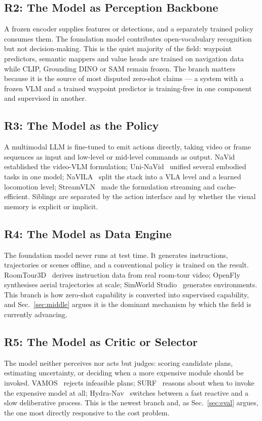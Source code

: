\documentclass[journal]{IEEEtran}
\begin{document}
\subsection{R2: The Model as Perception Backbone}
A frozen encoder supplies features or detections, and a separately trained
policy consumes them. The foundation model contributes open-vocabulary
recognition but not decision-making. This is the quiet majority of the
field: waypoint predictors, semantic mappers and value heads are trained on
navigation data while CLIP, Grounding DINO or SAM remain frozen. The
branch matters because it is the source of most disputed zero-shot claims
--- a system with a frozen VLM and a trained waypoint predictor is
training-free in one component and supervised in another.

\subsection{R3: The Model as the Policy}
A multimodal LLM is fine-tuned to emit actions directly, taking video or
frame sequences as input and low-level or mid-level commands as output.
NaVid~\cite{zhang2024navid} established the video-VLM formulation;
Uni-NaVid~\cite{zhang2024navidb} unified several embodied tasks in one
model; NaVILA~\cite{cheng2024navila} split the stack into a VLA level and a
learned locomotion level; StreamVLN~\cite{wei2025streamvln} made the
formulation streaming and cache-efficient. Siblings are separated by the
action interface and by whether the visual memory is explicit or implicit.

\subsection{R4: The Model as Data Engine}
The foundation model never runs at test time. It generates instructions,
trajectories or scenes offline, and a conventional policy is trained on the
result. RoomTour3D~\cite{han2025roomtour} derives instruction data from real
room-tour video; OpenFly~\cite{gao2026openfly} synthesises aerial
trajectories at scale; SimWorld Studio~\cite{kang2026simworld} generates
environments. This branch is how zero-shot capability is converted into
supervised capability, and Sec.~\ref{sec:middle} argues it is the dominant
mechanism by which the field is currently advancing.

\subsection{R5: The Model as Critic or Selector}
The model neither perceives nor acts but judges: scoring candidate plans,
estimating uncertainty, or deciding when a more expensive module should be
invoked. VAMOS~\cite{castro2025vamos} rejects infeasible plans;
SURF~\cite{shinnick2026surf} reasons about when to invoke the expensive
model at all; Hydra-Nav~\cite{wang2026hydra} switches between a fast
reactive and a slow deliberative process. This is the newest branch and,
as Sec.~\ref{sec:eval} argues, the one most directly responsive to the
cost problem.
\end{document}
